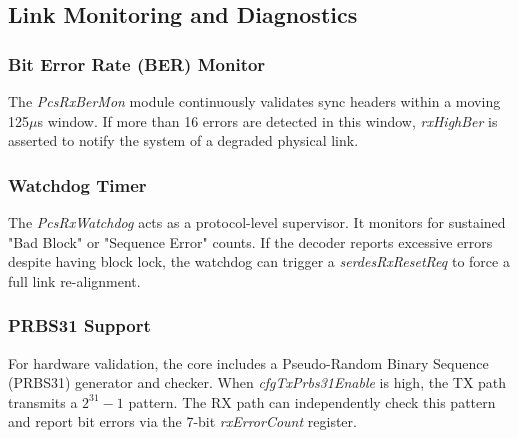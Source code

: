 \subsection{Link Monitoring and Diagnostics}

\subsubsection{Bit Error Rate (BER) Monitor}
The \textit{PcsRxBerMon} module continuously validates sync headers within a moving 125$\mu$s window. If more than 16 errors are detected in this window, \textit{rxHighBer} is asserted to notify the system of a degraded physical link.

\subsubsection{Watchdog Timer}
The \textit{PcsRxWatchdog} acts as a protocol-level supervisor. It monitors for sustained "Bad Block" or "Sequence Error" counts. If the decoder reports excessive errors despite having block lock, the watchdog can trigger a \textit{serdesRxResetReq} to force a full link re-alignment.

\subsubsection{PRBS31 Support}
For hardware validation, the core includes a Pseudo-Random Binary Sequence (PRBS31) generator and checker. When \textit{cfgTxPrbs31Enable} is high, the TX path transmits a $2^{31}-1$ pattern. The RX path can independently check this pattern and report bit errors via the 7-bit \textit{rxErrorCount} register.